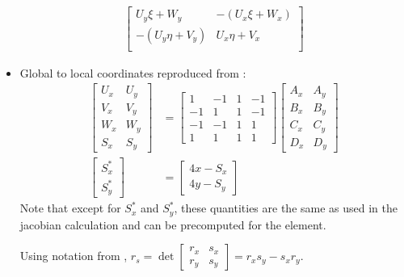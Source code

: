 \documentclass[10pt]{article}
\begin{document}
\begin{itemize}
\begin{align}
\begin{bmatrix}
                U_y \xi + W_y & -(U_x \xi + W_x) \\
                -(U_y \eta + V_y) & U_x \eta + V_x \\
            \end{bmatrix}
        \end{align}
    \item Global to local coordinates reproduced from \textcite{hua90}:
        \begin{align}
            \begin{bmatrix}
                U_x & U_y \\
                V_x & V_y \\
                W_x & W_y \\
                S_x & S_y
            \end{bmatrix}
            &=
            \begin{bmatrix}
                1 & -1 & 1 & -1 \\
                -1 & 1 & 1 & -1 \\
                -1 & -1 & 1 & 1 \\
                1 & 1 & 1 & 1
            \end{bmatrix}
            \begin{bmatrix}
                A_x & A_y \\
                B_x & B_y \\
                C_x & C_y \\
                D_x & D_y
            \end{bmatrix}
            \\
            \begin{bmatrix}
                S^*_x \\
                S^*_y
            \end{bmatrix}
            &=
            \begin{bmatrix}
                4 x - S_x \\
                4 y - S_y
            \end{bmatrix}
        \end{align}
        Note that except for $S^*_x$ and $S^*_y$, these quantities are the same as used in the jacobian calculation and can be precomputed for the element.

        Using notation from \textcite{hua90}, $r_s = \det \begin{bmatrix} r_x & s_x \\ r_y & s_y \end{bmatrix} = r_x s_y - s_x r_y $.


\end{itemize}
\end{document}
